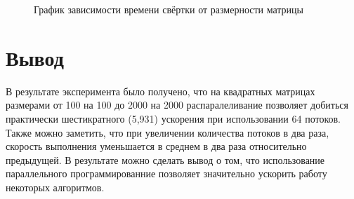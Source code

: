\newpage

\begin{figure}[ph!]
	\caption{График зависимости времени свёртки от размерности матрицы}
\end{figure}

\section{Вывод}
В результате эксперимента было получено, что на квадратных матрицах размерами от 100 на 100 до 2000 на 2000 распаралеливание позволяет добиться практически шестикратного (5,931) ускорения при использовании 64 потоков. Также можно заметить, что при увеличении количества потоков в два раза, скорость выполнения уменьшается в среднем в два раза относительно предыдущей. В результате можно сделать вывод о том, что использование параллельного программированние позволяет значительно ускорить работу некоторых алгоритмов.